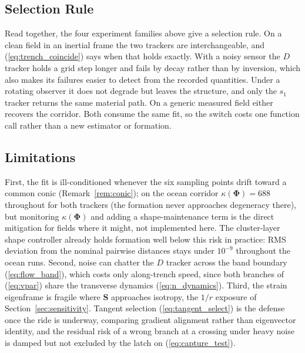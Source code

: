 \documentclass[lettersize,journal]{IEEEtran}
\begin{document}
\subsection{Selection Rule}
\label{sec:selection_rule}

Read together, the four experiment families above give a selection rule.
On a clean field in an inertial frame the two trackers are
interchangeable, and (\ref{eq:trench_coincide}) says when that holds
exactly. With a noisy sensor the $D$ tracker holds a grid step longer and
fails by decay rather than by inversion, which also makes its failures
easier to detect from the recorded quantities. Under a rotating observer
it does not degrade but leaves the structure, and only the $s_1$ tracker
returns the same material path. On a generic measured field either
recovers the corridor. Both consume the same fit, so the switch costs one
function call rather than a new estimator or formation.

\subsection{Limitations}
\label{sec:limitations}

First, the fit is ill-conditioned whenever the six sampling
points drift toward a common conic (Remark~\ref{rem:conic}); on the
ocean corridor $\kappa(\boldsymbol{\Phi}) = 688$ throughout for both
trackers (the formation never approaches degeneracy there), but
monitoring $\kappa(\boldsymbol{\Phi})$ and adding a
shape-maintenance term is the direct mitigation for fields where it
might, not implemented here. The cluster-layer shape controller already
holds formation well below this risk in practice: RMS deviation from the
nominal pairwise distances stays under $10^{-9}$ throughout the ocean
runs.
Second, noise can chatter the $D$ tracker across the band boundary
(\ref{eq:flow_band}), which costs only along-trench speed, since both
branches of (\ref{eq:vpar}) share the transverse dynamics
(\ref{eq:n_dynamics}). Third, the strain eigenframe is fragile where
$\mathbf{S}$ approaches isotropy, the $1/r$ exposure of
Section~\ref{sec:sensitivity}. Tangent selection (\ref{eq:tangent_select})
is the defense once the ride is underway, comparing gradient alignment
rather than eigenvector identity, and the residual risk of a wrong branch
at a crossing under heavy noise is damped but not excluded by the latch on
(\ref{eq:capture_test}).
\end{document}

